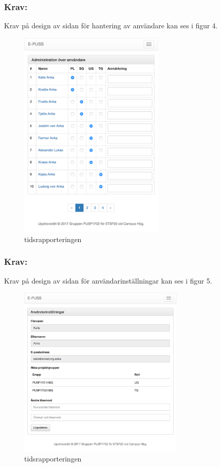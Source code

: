 \documentclass[paper=a4, fontsize=11pt,twoside]{article}
\begin{document}
\subsubsection{Krav:} Krav på design av sidan för hantering av användare kan ses i figur 4.
\begin{figure}[H]
\centering
\includegraphics[width=7cm]{anvandarhantering.png}
\caption{tidsrapporteringen}
\end{figure}

\subsubsection{Krav:} Krav på design av sidan för användarinställningar kan ses i figur 5.
\begin{figure}[H]
\centering
\includegraphics[width=8cm]{user_settings_page.png}
\caption{tidsrapporteringen}
\end{figure}
\end{document}

